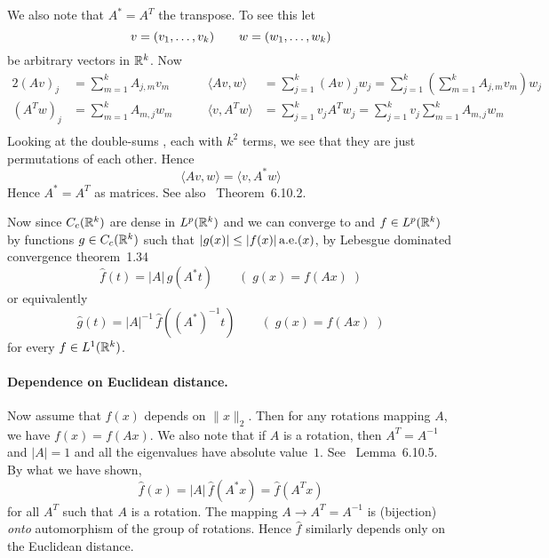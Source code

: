 \begin{enumerate}
We also note that \(A^* = A^T\) the transpose. To see this let
\begin{equation*}
v = (v_1,\ldots,v_{k}) \qquad w = (w_1,\ldots,w_{k})
\end{equation*}
be arbitrary vectors in \(\mathbb{R}^k\). Now 
\begin{alignat*}{2}
(Av)_j &= \sum_{m=1}^k A_{j,m}v_m
\qquad
  & \langle Av,w \rangle 
     &= \sum_{j=1}^k (Av)_jw_j 
     =\sum_{j=1}^k  \left(\sum_{m=1}^k A_{j,m}v_m\right)w_j \\
(A^Tw)_j &= \sum_{m=1}^k A_{m,j}w_m
\qquad
  & \langle v,A^Tw \rangle 
     &= \sum_{j=1}^k v_jA^Tw_j 
     =\sum_{j=1}^k v_j \sum_{m=1}^k A_{m,j}w_m \\
\end{alignat*}
Looking at the double-sums , each with \(k^2\) terms, 
we see that they are just permutations of each other.
Hence 
\begin{equation*}
\langle Av,w\rangle = \langle v, A^*w\rangle
\end{equation*}
Hence \(A^* = A^T\) as matrices.
See also \cite{Herstein1975}~Theorem~6.10.2.

Now since \(C_c(\mathbb{R}^k)\) are dense in \(L^p(\mathbb{R}^k)\)
and we can converge to and \(f\in L^p(\mathbb{R}^k)\)
by functions \(g\in C_c(\mathbb{R}^k)\) 
such that \(|g(x)|\leq |f(x)|\,\textrm{a.e.}(x)\), 
by Lebesgue dominated convergence theorem~1.34
\begin{equation}  \label{eq:fourier:jacobian}
\widehat{f}(t) = |A|\,\widehat{g}(A^*t) \qquad (\;g(x)=f(Ax)\;)
\end{equation}
or equivalently
\begin{equation}  \label{eq:fourier:jacobian:alt}
\widehat{g}(t) = |A|^{-1}\,\widehat{f}\left(\left(A^*\right)^{-1}t\right) 
\qquad (\;g(x)=f(Ax)\;)
\end{equation}
for every \(f\in L^1(\mathbb{R}^k)\).

\paragraph{Dependence on Euclidean distance.}
Now assume that \(f(x)\) depends on \(\|x\|_2\).
Then for any rotations mapping $A$, we have \(f(x) = f(Ax)\).
We also note that if $A$ is a rotation, then \(A^T = A^{-1}\) 
and \(|A|=1\) and  all the eigenvalues have absolute value~$1$.
See \cite{Herstein1975}~Lemma~6.10.5.
By what we have shown, 
\begin{equation*}
\widehat{f}(x) = |A|\,\widehat{f}(A^*x) = \widehat{f}(A^Tx)
\end{equation*}
for all \(A^T\) such that $A$ is a rotation.
The mapping \(A\to A^T=A^{-1}\) is (bijection) 
\emph{onto} automorphism of the group of rotations.
Hence \(\widehat{f}\) similarly depends only on the Euclidean distance.


\end{enumerate}
